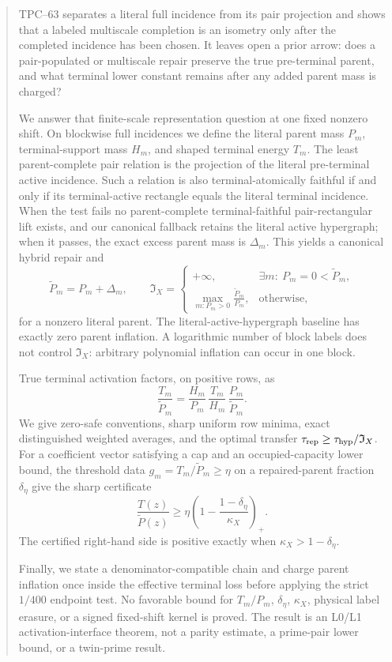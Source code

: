 \begin{abstract}
TPC--63 separates a literal full incidence from its pair projection and
shows that a labeled multiscale completion is an isometry only after the
completed incidence has been chosen.  It leaves open a prior arrow: does a
pair-populated or multiscale repair preserve the true pre-terminal parent,
and what terminal lower constant remains after any added parent mass is
charged?

We answer that finite-scale representation question at one fixed nonzero
shift.  On blockwise full incidences we define the literal parent mass
\(P_m\), terminal-support mass \(H_m\), and shaped terminal energy
\(T_m\).  The least parent-complete pair relation is the projection of the
literal pre-terminal active incidence.  Such a relation is also
terminal-atomically faithful if and only if its terminal-active rectangle
 equals the literal terminal incidence.  When the test fails no
 parent-complete terminal-faithful pair-rectangular lift exists, and our
 canonical fallback retains the literal active hypergraph; when it passes,
 the exact excess parent mass is \(\Delta_m\).  This yields a canonical
 hybrid repair and
\[
 \widetilde P_m=P_m+\Delta_m,
 \qquad
 \mathfrak I_X=
 \begin{cases}
  +\infty,&\exists m:\ P_m=0<\widetilde P_m,\\
  \displaystyle\max_{m:P_m>0}\frac{\widetilde P_m}{P_m},
      &\text{otherwise},
 \end{cases}
\]
for a nonzero literal parent.  The
literal-active-hypergraph baseline has exactly zero parent inflation.  A logarithmic
number of block labels does not control \(\mathfrak I_X\): arbitrary
polynomial inflation can occur in one block.

True terminal activation factors, on positive rows, as
\[
 \frac{T_m}{\widetilde P_m}
 =\frac{H_m}{P_m}\,
  \frac{T_m}{H_m}\,
  \frac{P_m}{\widetilde P_m}.
\]
We give zero-safe conventions, sharp uniform row minima, exact
distinguished weighted averages, and the optimal transfer
\(\tau_{\rm rep}\ge\tau_{\rm hyp}/\mathfrak I_X\).  For a coefficient
vector satisfying a cap and an occupied-capacity lower bound, the threshold
data \(g_m=T_m/\widetilde P_m\ge\eta\) on a repaired-parent fraction
\(\delta_\eta\) give the sharp certificate
\[
 \frac{T(z)}{\widetilde P(z)}
 \ge
 \eta\left(1-\frac{1-\delta_\eta}{\kappa_X}\right)_+.
\]
The certified right-hand side is positive exactly when
\(\kappa_X>1-\delta_\eta\).

Finally, we state a denominator-compatible chain and charge parent inflation
once inside the effective terminal loss before applying the strict
\(1/400\) endpoint test.  No favorable bound for \(T_m/P_m\),
\(\delta_\eta\), \(\kappa_X\), physical label erasure, or a signed
fixed-shift kernel is proved.  The result is an L0/L1 activation-interface
theorem, not a parity estimate, a prime-pair lower bound, or a twin-prime
result.
\end{abstract}
